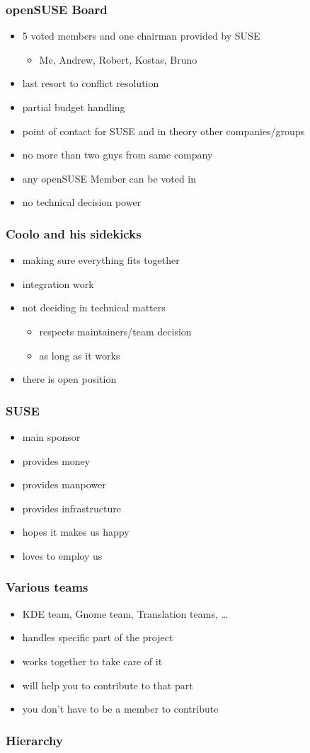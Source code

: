 \documentclass{beamer}
\begin{document}
\begin{frame}[t]
\frametitle{openSUSE Board}
\begin{itemize}
\item 5 voted members and one chairman provided by SUSE
\begin{itemize}
\item Me, Andrew, Robert, Kostas, Bruno
\end{itemize}
\item last resort to conflict resolution
\item partial budget handling
\item point of contact for SUSE and in theory other companies/groups
\item no more than two guys from same company
\item any openSUSE Member can be voted in
\item no technical decision power
\end{itemize}
\end{frame}

\begin{frame}[t]
\frametitle{Coolo and his sidekicks}
\begin{itemize}
\item making sure everything fits together
\item integration work
\item not deciding in technical matters
\begin{itemize}
\item respects maintainers/team decision
\item as long as it works
\end{itemize}
\item there is open position
\end{itemize}
\end{frame}

\begin{frame}[t]
\frametitle{SUSE}
\begin{itemize}
\item main sponsor
\item provides money
\item provides manpower
\item provides infrastructure
\item hopes it makes us happy
\item loves to employ us
\end{itemize}
\end{frame}

\begin{frame}[t]
\frametitle{Various teams}
\begin{itemize}
\item KDE team, Gnome team, Translation teams, \dots
\item handles specific part of the project
\item works together to take care of it
\item will help you to contribute to that part
\item you don't have to be a member to contribute
\end{itemize}
\end{frame}

\begin{frame}[t]
\frametitle{Hierarchy}
\end{frame}

\end{document}
